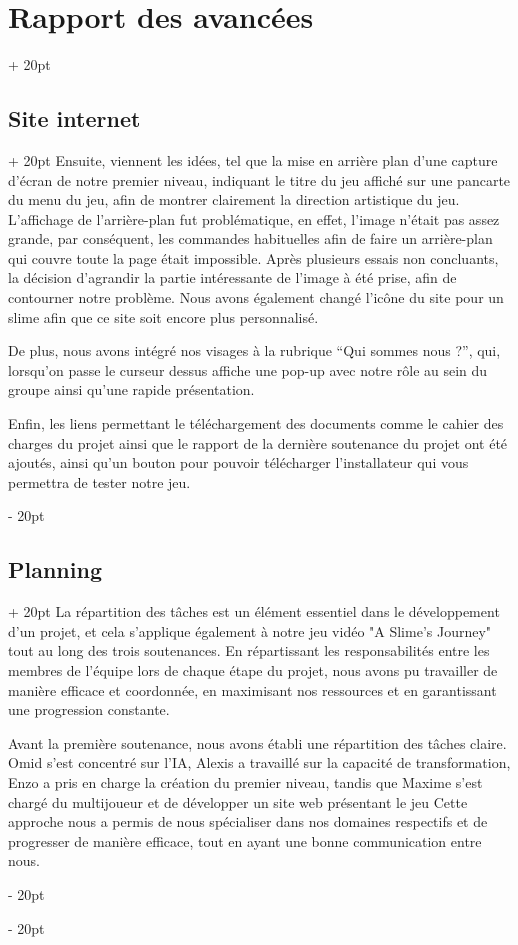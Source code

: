 \documentclass[a4paper, 12pt, twoside]{article}
\newcommand{\ind}[1][20pt]{\advance\leftskip + #1}
\newcommand{\deind}[1][20pt]{\advance\leftskip - #1}
\newenvironment{indt}[2][20pt]{#2 \par \ind[#1]}{\par \deind} %
\begin{document}
\begin{indt}{\section{Rapport des avancées}}
\begin{indt}{\subsection{Site internet}}
            Ensuite, viennent les idées, tel que la mise en arrière plan d’une capture d’écran de notre premier niveau, indiquant le titre du jeu affiché sur une pancarte du menu du jeu, afin de montrer clairement la direction artistique du jeu. L’affichage de l’arrière-plan fut problématique, en effet, l’image n'était pas assez grande, par conséquent, les commandes habituelles afin de faire un arrière-plan qui couvre toute la page était impossible. Après plusieurs essais non concluants, la décision d'agrandir la partie intéressante de l’image à été prise, afin de contourner notre problème. Nous avons également changé l'icône du site pour un slime afin que ce site soit encore plus personnalisé.

            De plus, nous avons intégré nos visages à la rubrique “Qui sommes nous ?”, qui, lorsqu’on passe le curseur dessus affiche une pop-up avec notre rôle au sein du groupe ainsi qu’une rapide présentation.

            Enfin, les liens permettant le téléchargement des documents comme le cahier des charges du projet ainsi que le rapport de la dernière soutenance du projet ont été ajoutés, ainsi qu’un bouton pour pouvoir télécharger l’installateur qui vous permettra de tester notre jeu.
        \end{indt}

        \newpage

        \begin{indt}{\subsection{Planning}}
            La répartition des tâches est un élément essentiel dans le développement d'un projet, et cela s'applique également à notre jeu vidéo "A Slime's Journey" tout au long des trois soutenances. En répartissant les responsabilités entre les membres de l'équipe lors de chaque étape du projet, nous avons pu travailler de manière efficace et coordonnée, en maximisant nos ressources et en garantissant une progression constante.

            Avant la première soutenance, nous avons établi une répartition des tâches claire. Omid s'est concentré sur l'IA, Alexis a travaillé sur la capacité de transformation, Enzo a pris en charge la création du premier niveau, tandis que Maxime s'est chargé du multijoueur et de développer un site web présentant le jeu Cette approche nous a permis de nous spécialiser dans nos domaines respectifs et de progresser de manière efficace, tout en ayant une bonne communication entre nous.


\end{indt}
\end{indt}
\end{document}
